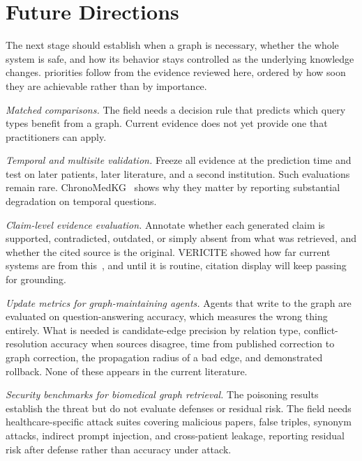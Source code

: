 \section{Future Directions}

The next stage should establish when a graph is necessary, whether the whole system is safe, and how its behavior stays controlled as the underlying knowledge changes.  priorities follow from the evidence reviewed here, ordered by how soon they are achievable rather than by importance.

\emph{Matched comparisons.}  The field needs a decision rule that predicts which query types benefit from a graph. Current evidence does not yet provide one that practitioners can apply.

\emph{Temporal and multisite validation.} Freeze all evidence at the prediction time and test on later patients, later literature, and a second institution. Such evaluations remain rare. ChronoMedKG~\cite{ahmed2026chronomedkg} shows why they matter by reporting substantial degradation on temporal questions.

\emph{Claim-level evidence evaluation.} Annotate whether each generated claim is supported, contradicted, outdated, or simply absent from what was retrieved, and whether the cited source is the original. VERICITE showed how far current systems are from this~\cite{ma2026vericite}, and until it is routine, citation display will keep passing for grounding.

\emph{Update metrics for graph-maintaining agents.} Agents that write to the graph are evaluated on question-answering accuracy, which measures the wrong thing entirely. What is needed is candidate-edge precision by relation type, conflict-resolution accuracy when sources disagree, time from published correction to graph correction, the propagation radius of a bad edge, and demonstrated rollback. None of these appears in the current literature.

\emph{Security benchmarks for biomedical graph retrieval.} The poisoning results~\cite{yang2024poisoning,alber2025poisoning,zou2025poisonedrag} establish the threat but do not evaluate defenses or residual risk. The field needs healthcare-specific attack suites covering malicious papers, false triples, synonym attacks, indirect prompt injection, and cross-patient leakage, reporting residual risk after defense rather than accuracy under attack.

